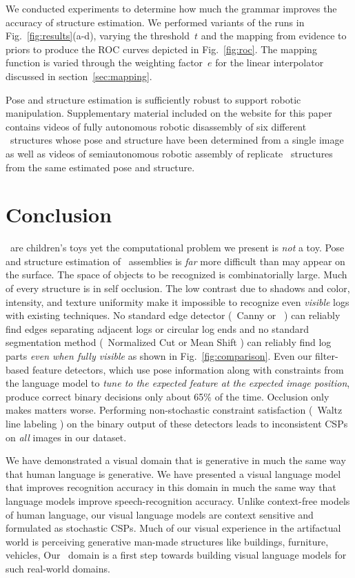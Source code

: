 We conducted experiments to determine how much the grammar improves the
accuracy of structure estimation.
%
We performed variants of the runs in Fig.~\ref{fig:results}(a-d), varying the
threshold~$t$ and the mapping from evidence to priors to produce the ROC curves
depicted in Fig.~\ref{fig:roc}.
%
The mapping function is varied through the weighting factor~$e$ for the linear
interpolator discussed in section~\ref{sec:mapping}.

Pose and structure estimation is sufficiently robust to support robotic
manipulation.
%
Supplementary material included on the website for this paper contains videos
of fully autonomous robotic disassembly of six different \LincolnLog\
structures whose pose and structure have been determined from a single image as
well as videos of semiautonomous robotic assembly of replicate \LincolnLog\
structures from the same estimated pose and structure.

\section{Conclusion}
\label{sec:conclusion}

\LincolnLogs\ are children's toys yet the computational problem we present is
\emph{not} a toy.
%
Pose and structure estimation of \LincolnLog\ assemblies is \emph{far} more
difficult than may appear on the surface.
%
The space of objects to be recognized is combinatorially large.
%
Much of every structure is in self occlusion.
%
The low contrast due to shadows and color, intensity, and texture uniformity
make it impossible to recognize even \emph{visible} logs with existing
techniques.
%
No standard edge detector (\eg\ Canny \cite{Canny1986} or \Pb\
\cite{Maire2008}) can reliably find edges separating adjacent logs or circular
log ends and no standard segmentation method (\eg\ Normalized Cut
\cite{Shi2000} or Mean Shift \cite{Comaniciu2002}) can reliably find log parts
\emph{even when fully visible} as shown in Fig.~\ref{fig:comparison}.
%
Even our filter-based feature detectors, which use pose information along with
constraints from the language model to \emph{tune to the expected feature at
  the expected image position}, produce correct binary decisions only about
65\% of the time.
%
Occlusion only makes matters worse.
%
Performing non-stochastic constraint satisfaction (\eg\ Waltz line labeling
\cite{Waltz1975}) on the binary output of these detectors leads to
inconsistent CSPs on \emph{all} images in our dataset.

We have demonstrated a visual domain that is generative in much the same way
that human language is generative.
%
We have presented a visual language model that improves recognition accuracy in
this domain in much the same way that language models improve
speech-recognition accuracy.
%
Unlike context-free models of human language, our visual language models are
context sensitive and formulated as stochastic CSPs.
%
Much of our visual experience in the artifactual world is perceiving generative
man-made structures like buildings, furniture, vehicles, \etc{}
%
Our \LincolnLog\ domain is a first step towards building visual language models
for such real-world domains.

